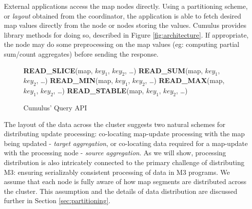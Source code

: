 \documentclass{vldb}
\begin{document}
External applications access the map nodes directly.  Using a partitioning scheme, or \textit{layout} obtained from the coordinator, the application is able to fetch desired map values directly from the node or nodes storing the values.  Cumulus provides library methods for doing so, described in Figure \ref{fig:architecture}.  If appropriate, the node may do some preprocessing on the map values (eg: computing partial sum/count aggregates) before sending the response.  

\begin{figure}
\begin{algorithmic}
\STATE \textbf{READ\_SLICE}(map, $key_1$, $key_2$, \ldots)
\STATE {}
\STATE \textbf{READ\_SUM}(map, $key_1$, $key_2$, \ldots)
\STATE \textbf{READ\_MIN}(map, $key_1$, $key_2$, \ldots)
\STATE \textbf{READ\_MAX}(map, $key_1$, $key_2$, \ldots)
\STATE {}
\STATE \textbf{READ\_STABLE}(map, $key_1$, $key_2$, \ldots)
\STATE {}
\end{algorithmic}
\caption{Cumulus' Query API}
\label{fig:queryapi}
\end{figure}

The layout of the data across the cluster suggests two natural schemes for distributing update processing: co-locating map-update processing with the map being updated - \textit{target aggregation}, or co-locating data required for a map-update with the processing node - \textit{source aggregation}.  As we will show, processing distribution is also intricately connected to the primary challenge of distributing M3: ensuring serializably consistent processing of data in M3 programs.  We assume that each node is fully aware of how map segments are distributed across the cluster.  This assumption and the details of data distribution are discussed further in Section \ref{sec:partitioning}.

\end{document}
